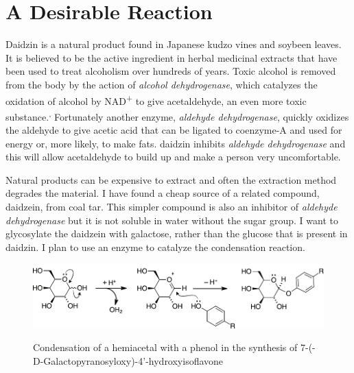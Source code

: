 \documentclass[]{tufte-handout}
\begin{document}
\section{A Desirable Reaction}

Daidzin is a natural product found in Japanese kudzo vines and soybeen leaves. It is believed to be the active ingredient in herbal medicinal extracts that have been used to treat alcoholism over hundreds of years. Toxic alcohol is removed from the body by the action of \emph{alcohol dehydrogenase}, which cata\-lyz\-es the oxidation of alcohol by NAD\textsuperscript{+} to give acetaldehyde, an even more toxic substance.\textsuperscript{,}
 Fortunately another enzyme, \emph{aldehyde de\-hy\-drog\-en\-ase}, quick\-ly oxid\-izes the aldehyde to give acetic acid that can be ligated to coenzyme-A and used for energy or, more likely, to make fats. daidzin inhibits \emph{aldehyde de\-hy\-drog\-en\-ase} and this will allow acetaldehyde to build up and make a person very uncomfortable. 

Natural products can be expensive to extract and often the extraction method degrades the material. I have found a cheap source of a related compound, daidzein, from coal tar. This simpler compound is also an inhibitor of \emph{aldehyde de\-hy\-drog\-en\-ase} but it is not soluble in water without the sugar group. I want to glycosylate the daidzein with galactose, rather than the glucose that is present in daidzin. I plan to use an enzyme to catalyze the condensation reaction.

\begin{figure}[h!]

  \caption[0mm]{Condensation of a hemiacetal with a phenol in the synthesis of  7-(\textbeta -D-Galactopyranosyloxy)-4'-hydroxyisoflavone} 
  \vspace{2mm}
    \centering
  \includegraphics[scale=0.6]{reaction1.pdf}
  \vspace{5mm}
  \label{fig:fig2}
\end{figure}
\end{document}
